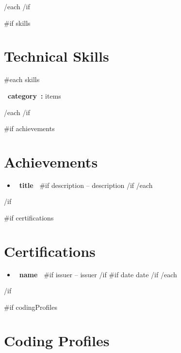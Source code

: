 \documentclass[10pt,a4paper]{article}
\begin{document}
\vspace{4pt}

{{/each}}
{{/if}}

{{#if skills}}
\section{Technical Skills}

{{#each skills}}

\textbf{ {{~category~}}:}
{{items}}

\par
\vspace{3pt}

{{/each}}
{{/if}}

{{#if achievements}}
\section{Achievements}

\begin{itemize}
    {{#each achievements}}
    \item
    \textbf{ {{~title~}} }
    {{#if description}}
    -- {{description}}
    {{/if}}
    {{/each}}
\end{itemize}

{{/if}}

{{#if certifications}}
\section{Certifications}

\begin{itemize}
    {{#each certifications}}
    \item
    \textbf{ {{~name~}} }
    {{#if issuer}}
    -- {{issuer}}
    {{/if}}
    {{#if date}}
    \hfill {\small {{date}} }
    {{/if}}
    {{/each}}
\end{itemize}

{{/if}}

{{#if codingProfiles}}
\section{Coding Profiles}
\end{document}
